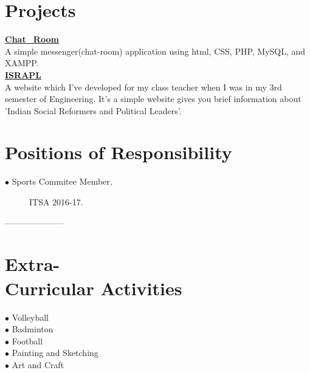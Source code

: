 \documentclass[margin,line]{res}
\newenvironment{list2}{
  \begin{list}{$\bullet$}{%
      \setlength{\itemsep}{0in}
      \setlength{\parsep}{0in} \setlength{\parskip}{0in}
      \setlength{\topsep}{0in} \setlength{\partopsep}{0in}
      \setlength{\leftmargin}{0.2in}}}{\end{list}}
\begin{document}
\begin{resume}
\section{\sc Projects}
\href{https://github.com/PurveshMakode24/Chat_Room}{\bf Chat\_Room}\\
A simple messenger(chat-room) application using html, CSS, PHP, MySQL, and XAMPP.\\

\href{https://github.com/PurveshMakode24/ISRAPL}{\bf ISRAPL}\\
A website which I've developed for my class teacher when I was in my 3rd semester of Engineering. It's a simple website gives you brief information about 'Indian Social Reformers and Political Leaders'.\\


\section{\sc Positions of Responsibility}
 
 \begin{description}
  \item[$\bullet$ Sports Commitee Member,]  ITSA 2016-17.
 
\end{description}

---------------------

\section{\sc Extra-\\Curricular Activities}
  \begin{description}
   \item[$\bullet$ Volleyball]
   \item[$\bullet$ Badminton]
   \item[$\bullet$ Football]
   \item[$\bullet$ Painting and Sketching]
   \item[$\bullet$ Art and Craft]
\end{description}



\iffalse
\section{\sc Publications}

\begin{list2}
\item LastName Author1, First initial., LastName Author2, First initial.,  "Title",{\em Where published}, Date
\item LastName Author1, First initial., LastName Author2, First initial.,  "Title",{\em Where published}, Date
\end{list2}


\section{\sc References }
Available upon request.
\fi
\end{resume}
\end{document}

